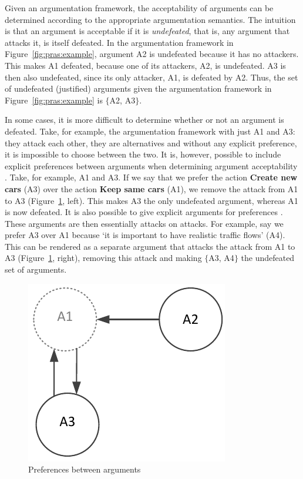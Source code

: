 Given an argumentation framework, the acceptability of arguments can be determined according to the appropriate argumentation semantics. The intuition is that an argument is acceptable if it is \emph{undefeated}, that is, any argument that attacks it, is itself defeated. In the argumentation framework in Figure~\ref{fig:pras:example}, argument A2 is undefeated because it has no attackers. This makes A1 defeated, because one of its attackers, A2, is undefeated. A3 is then also undefeated, since its only attacker, A1, is defeated by A2. Thus, the set of undefeated (justified) arguments given the argumentation framework in Figure~\ref{fig:pras:example} is $\{$A2, A3$\}$. 

In some cases, it is more difficult to determine whether or not an argument is defeated. Take, for example, the argumentation framework with just A1 and A3: they attack each other, they are alternatives and without any explicit preference, it is impossible to choose between the two. It is, however, possible to include explicit preferences between arguments when determining argument acceptability \cite{amgoud2002reasoning}. Take, for example, A1 and A3. If we say that we prefer the action \textbf{Create new cars} (A3) over the action \textbf{Keep same cars} (A1), we remove the attack from A1 to A3 (Figure~\ref{fig:pras:example2}, left). This makes A3 the only undefeated argument, whereas A1 is now defeated. It is also possible to give explicit arguments for preferences \cite{modgil2009}. These arguments are then essentially attacks on attacks. For example, say we prefer A3 over A1 because `it is important to have realistic traffic flows' (A4). This can be rendered as a separate argument that attacks the attack from A1 to A3 (Figure~\ref{fig:pras:example2}, right), removing this attack and making $\{$A3, A4$\}$ the undefeated set of arguments.

\begin{figure}[ht]
\centering
\includegraphics[scale=0.8]{img/Fig2}
\caption{Preferences between arguments}
\label{fig:pras:example2}
\end{figure}  

